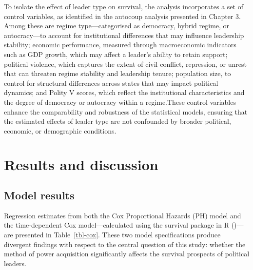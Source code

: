 \documentclass[
  12pt,
]{report}
\begin{document}
To isolate the effect of leader type on survival, the analysis
incorporates a set of control variables, as identified in the autocoup
analysis presented in Chapter 3. Among these are regime
type---categorised as democracy, hybrid regime, or autocracy---to
account for institutional differences that may influence leadership
stability; economic performance, measured through macroeconomic
indicators such as GDP growth, which may affect a leader's ability to
retain support; political violence, which captures the extent of civil
conflict, repression, or unrest that can threaten regime stability and
leadership tenure; population size, to control for structural
differences across states that may impact political dynamics; and Polity
V scores, which reflect the institutional characteristics and the degree
of democracy or autocracy within a regime.These control variables
enhance the comparability and robustness of the statistical models,
ensuring that the estimated effects of leader type are not confounded by
broader political, economic, or demographic conditions.

\section{Results and discussion}\label{results-and-discussion-1}

\subsection*{Model results}\label{model-results}

Regression estimates from both the Cox Proportional Hazards (PH) model
and the time-dependent Cox model---calculated using the survival package
in R ()---are presented in
Table~\ref{tbl-cox}. These two model specifications produce divergent
findings with respect to the central question of this study: whether the
method of power acquisition significantly affects the survival prospects
of political leaders.
\end{document}
